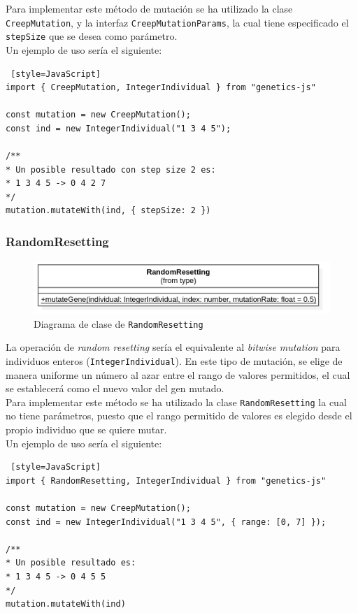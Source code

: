 Para implementar este método de mutación se ha utilizado la clase \texttt{CreepMutation}, y la interfaz \texttt{CreepMutationParams}, la cual tiene especificado el \texttt{stepSize} que se desea como parámetro. \\

Un ejemplo de uso sería el siguiente:

\begin{lstlisting} [style=JavaScript]
import { CreepMutation, IntegerIndividual } from "genetics-js"

const mutation = new CreepMutation();
const ind = new IntegerIndividual("1 3 4 5");

/**
* Un posible resultado con step size 2 es:
* 1 3 4 5 -> 0 4 2 7
*/
mutation.mutateWith(ind, { stepSize: 2 })
\end{lstlisting}

\subsubsection{RandomResetting}

\begin{figure}[ht]
    \centering
    \includegraphics[scale=0.4]{mem/images/cap-4/4.2.7(Mutation)/RandomResetting.png}
    \caption{Diagrama de clase de \texttt{RandomResetting}}
    \label{fig:my_label}
\end{figure}

La operación de \textit{random resetting} sería el equivalente al \textit{bitwise mutation} para individuos enteros (\texttt{IntegerIndividual}). En este tipo de mutación, se elige de manera uniforme un número al azar entre el rango de valores permitidos, el cual se establecerá como el nuevo valor del gen mutado. \\

Para implementar este método se ha utilizado la clase \texttt{RandomResetting} la cual no tiene parámetros, puesto que el rango permitido de valores es elegido desde el propio individuo que se quiere mutar. \\

Un ejemplo de uso sería el siguiente: \\

\begin{lstlisting} [style=JavaScript]
import { RandomResetting, IntegerIndividual } from "genetics-js"

const mutation = new CreepMutation();
const ind = new IntegerIndividual("1 3 4 5", { range: [0, 7] });

/**
* Un posible resultado es:
* 1 3 4 5 -> 0 4 5 5
*/
mutation.mutateWith(ind)
\end{lstlisting}

